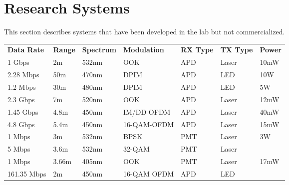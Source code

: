 \section{Research Systems}
This section describes systems that have been developed in the lab but not
commercialized.

\begin{table}[H]
\begin{tabular}{lllllll}
\textbf{Data Rate} & \textbf{Range} & \textbf{Spectrum} & \textbf{Modulation} &
\textbf{RX Type} & \textbf{TX Type} & \textbf{Power} \\
1 Gbps      & 2m     & 532nm & OOK         & APD & Laser & 10mW           \\
2.28 Mbps   & 50m    & 470nm & DPIM        & APD & LED   & 10W            \\
1.2 Mbps    & 30m    & 480nm & DPIM        & APD & LED   & 5W             \\
2.3 Gbps    & 7m     & 520nm & OOK         & APD & Laser & 12mW           \\
1.45 Gbps   & 4.8m   & 450nm & IM/DD OFDM  & APD & Laser & 40mW           \\
4.8 Gbps    & 5.4m   & 450nm & 16-QAM-OFDM & APD & Laser & 15mW           \\
1 Mbps      & 3m     & 532nm & BPSK        & PMT & Laser & 3W             \\
5 Mbps      & 3.6m   & 532nm & 32-QAM      & PMT & Laser &                \\
1 Mbps      & 3.66m  & 405nm & OOK         & PMT & Laser & 17mW           \\
161.35 Mbps & 2m     & 450nm & 16-QAM OFDM & APD & LED  &
\end{tabular}
\end{table}
